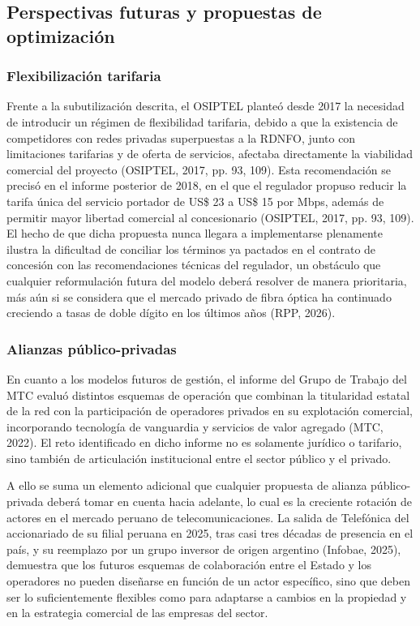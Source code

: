\subsection{Perspectivas futuras y propuestas de optimización}

\subsubsection{Flexibilización tarifaria}
Frente a la subutilización descrita, el OSIPTEL planteó desde 2017 la necesidad de introducir un régimen de flexibilidad tarifaria, debido a que la existencia de competidores con redes privadas superpuestas a la RDNFO, junto con limitaciones tarifarias y de oferta de servicios, afectaba directamente la viabilidad comercial del proyecto (OSIPTEL, 2017, pp. 93, 109). Esta recomendación se precisó en el informe posterior de 2018, en el que el regulador propuso reducir la tarifa única del servicio portador de US\$ 23 a US\$ 15 por Mbps, además de permitir mayor libertad comercial al concesionario (OSIPTEL, 2017, pp. 93, 109). El hecho de que dicha propuesta nunca llegara a implementarse plenamente ilustra la dificultad de conciliar los términos ya pactados en el contrato de concesión con las recomendaciones técnicas del regulador, un obstáculo que cualquier reformulación futura del modelo deberá resolver de manera prioritaria, más aún si se considera que el mercado privado de fibra óptica ha continuado creciendo a tasas de doble dígito en los últimos años (RPP, 2026).

\subsubsection{Alianzas público-privadas}
En cuanto a los modelos futuros de gestión, el informe del Grupo de Trabajo del MTC evaluó distintos esquemas de operación que combinan la titularidad estatal de la red con la participación de operadores privados en su explotación comercial, incorporando tecnología de vanguardia y servicios de valor agregado (MTC, 2022). El reto identificado en dicho informe no es solamente jurídico o tarifario, sino también de articulación institucional entre el sector público y el privado.

A ello se suma un elemento adicional que cualquier propuesta de alianza público-privada deberá tomar en cuenta hacia adelante, lo cual es la creciente rotación de actores en el mercado peruano de telecomunicaciones. La salida de Telefónica del accionariado de su filial peruana en 2025, tras casi tres décadas de presencia en el país, y su reemplazo por un grupo inversor de origen argentino (Infobae, 2025), demuestra que los futuros esquemas de colaboración entre el Estado y los operadores no pueden diseñarse en función de un actor específico, sino que deben ser lo suficientemente flexibles como para adaptarse a cambios en la propiedad y en la estrategia comercial de las empresas del sector.

